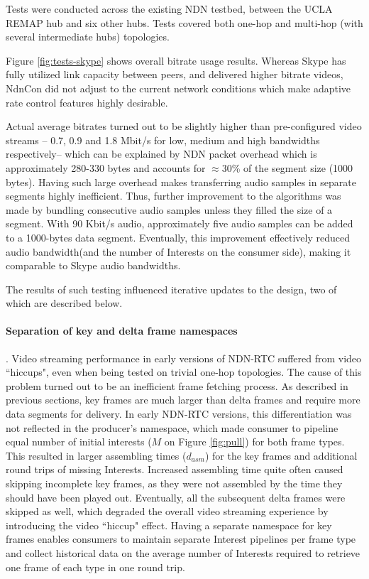 \documentclass{icn/sig-alternate-2012} %
\newcommand{\ndnrtcName}{NDN-RTC} %
\begin{document}
Tests were conducted across the existing NDN testbed, between the UCLA REMAP hub and six other hubs. Tests covered both one-hop and multi-hop (with several intermediate hubs) topologies.

Figure \ref{fig:tests-skype} shows overall bitrate usage results. Whereas Skype has fully utilized link capacity between peers, and delivered higher bitrate videos, NdnCon did not adjust to the current network conditions which make adaptive rate control features highly desirable.

Actual average bitrates turned out to be slightly higher than pre-configured video streams -- 0.7, 0.9 and 1.8 Mbit/s for low, medium and high bandwidths respectively-- which can be explained by NDN packet overhead which is approximately 280-330 bytes and accounts for $\approx$30\% of the segment size (1000 bytes). Having such large overhead makes transferring audio samples in separate segments highly inefficient. Thus, further improvement to the algorithms was made by bundling consecutive audio samples unless they filled the size of a segment. With 90 Kbit/s audio, approximately five audio samples can be added to a 1000-bytes data segment. Eventually, this improvement effectively reduced audio bandwidth(and the number of Interests on the consumer side), making it comparable to Skype audio bandwidths.


The results of such testing influenced iterative updates to the design, two of which are described below. 

\paragraph{Separation of key and delta frame namespaces}. Video streaming performance in early versions of \ndnrtcName{} suffered from video ``hiccups", even when being tested on trivial one-hop topologies. The cause of this problem turned out to be an inefficient frame fetching process.
As described in previous sections, key frames are much larger than delta frames and require more data segments for delivery. In early \ndnrtcName{} versions, this differentiation was not reflected in the producer's namespace, which made consumer to pipeline equal number of initial interests ($M$ on Figure \ref{fig:pull}) for both frame types. This resulted in larger assembling times ($d_{asm}$) for the key frames and additional round trips of missing Interests. Increased assembling time quite often caused skipping incomplete key frames, as they were not assembled by the time they should have been played out. Eventually, all the subsequent delta frames were skipped as well, which degraded the overall video streaming experience by introducing the video ``hiccup" effect. Having a separate namespace for key frames enables consumers to maintain separate Interest pipelines per frame type and collect historical data on the average number of Interests required to retrieve one frame of each type in one round trip.
\end{document}
